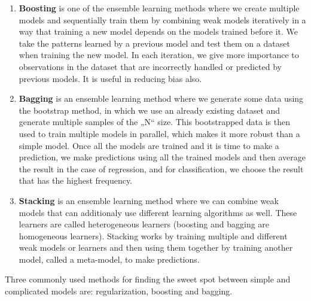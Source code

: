 \documentclass[
  letterpaper,
  DIV=11,
  numbers=noendperiod]{scrreprt}
\providecommand{\tightlist}{%
  \setlength{\itemsep}{0pt}\setlength{\parskip}{0pt}}\usepackage{longtable,booktabs,array}
\begin{document}
\begin{itemize}
  \begin{enumerate}
  \def\labelenumi{\arabic{enumi}.}
  \tightlist
  \item
    \textbf{Boosting} is one of the ensemble learning methods where we
    create multiple models and sequentially train them by combining weak
    models iteratively in a way that training a new model depends on the
    models trained before it. We take the patterns learned by a previous
    model and test them on a dataset when training the new model. In
    each iteration, we give more importance to observations in the
    dataset that are incorrectly handled or predicted by previous
    models. It is useful in reducing bias also.
  \item
    \textbf{Bagging} is an ensemble learning method where we generate
    some data using the bootstrap method, in which we use an already
    existing dataset and generate multiple samples of the „N`` size.
    This bootstrapped data is then used to train multiple models in
    parallel, which makes it more robust than a simple model. Once all
    the models are trained and it is time to make a prediction, we make
    predictions using all the trained models and then average the result
    in the case of regression, and for classification, we choose the
    result that has the highest frequency.
  \item
    \textbf{Stacking} is an ensemble learning method where we can
    combine weak models that can additionaly use different learning
    algorithms as well. These learners are called heterogeneous learners
    (boosting and bagging are homogeneous learners). Stacking works by
    training multiple and different weak models or learners and then
    using them together by training another model, called a meta-model,
    to make predictions.
  \end{enumerate}
\end{itemize}

Three commonly used methods for finding the sweet spot between simple
and complicated models are: regularization, boosting and bagging.
\end{document}
